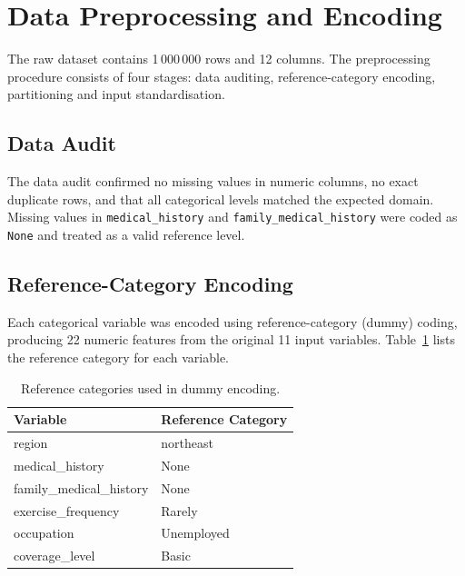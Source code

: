 \section{Data Preprocessing and Encoding}
\label{annexure:preprocessing}

The raw dataset contains 1\,000\,000 rows and 12 columns. The preprocessing procedure consists of four stages: data auditing, reference-category encoding, partitioning and input standardisation.

\subsection{Data Audit}
\label{annexure:data_loading}

The data audit confirmed no missing values in numeric columns, no exact duplicate rows, and that all categorical levels matched the expected domain. Missing values in \texttt{medical\_\allowbreak{}history} and \texttt{family\_medical\_\allowbreak{}history} were coded as \texttt{None} and treated as a valid reference level.

\subsection{Reference-Category Encoding}
\label{annexure:encoding}

Each categorical variable was encoded using reference-category (dummy) coding, producing 22 numeric features from the original 11 input variables. Table~\ref{tab:reference_categories} lists the reference category for each variable.

\begin{table}[htbp]
\centering
\begin{tabular}{ll}
\toprule
\textbf{Variable} & \textbf{Reference Category} \\
\midrule
region                    & northeast \\
medical\_history          & None \\
family\_medical\_history  & None \\
exercise\_frequency       & Rarely \\
occupation                & Unemployed \\
coverage\_level           & Basic \\
\bottomrule
\end{tabular}
\caption{Reference categories used in dummy encoding.}
\label{tab:reference_categories}
\end{table}

